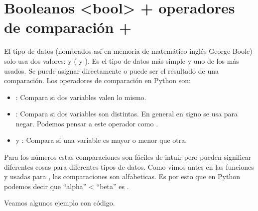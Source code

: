 \documentclass[a5paper,9pt,spanish]{sphinxmanual}
\begin{document}
\sphinxAtStartPar
{}

\sphinxstepscope


\chapter{Booleanos \textless{}bool\textgreater{} + operadores de comparación + }
\label{\detokenize{bool:booleanos-bool-operadores-de-comparacion-if}}\label{\detokenize{bool::doc}}
\sphinxAtStartPar
El tipo de datos  (nombrados así en memoria de matemático inglés
George Boole) solo usa dos valores:  y  ( y ).
Es el tipo de datos más simple y uno de los más usados.
Se puede asignar directamente o puede ser el resultado de una comparación.
Los operadores de comparación en Python son:
\begin{itemize}
\item {} 
\sphinxAtStartPar
\sphinxcode{\sphinxupquote{==}}: Compara si dos variables valen lo mismo.

\item {} 
\sphinxAtStartPar
\sphinxcode{\sphinxupquote{!=}}: Compara si dos variables son distintas. En general en signo \sphinxcode{\sphinxupquote{!}}
se usa para negar. Podemos pensar a este operador como .

\item {} 
\sphinxAtStartPar
\sphinxcode{\sphinxupquote{\textgreater{}}} y \sphinxcode{\sphinxupquote{\textless{}}}: Compara si una variable es mayor o menor que otra.

\end{itemize}

\sphinxAtStartPar
Para los números estas comparaciones son fáciles de intuir pero pueden significar
diferentes cosas para diferentes tipos de datos. Como vimos antes en las
funciones  y  usadas para , las comparaciones son alfabeticas.
Es por esto que en Python podemos decir que “alpha” \textless{} “beta” es .

\sphinxAtStartPar
Veamos algunos ejemplo con código.
\end{document}
